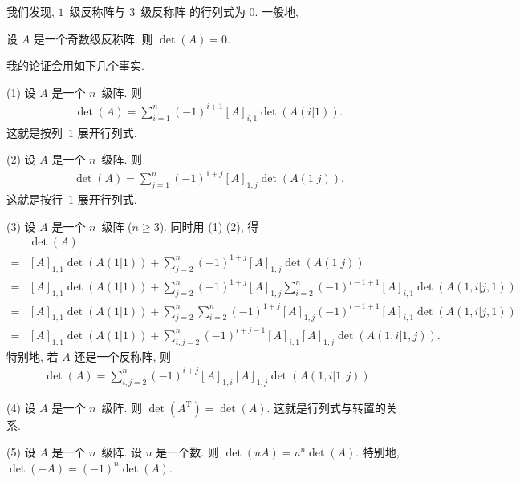 \documentclass[../libro.tex]{subfiles}
\begin{document}
我们发现, \(1\)~级反称阵与 \(3\)~级反称阵%
的行列式为 \(0\).
一般地,

\begin{theorem}
    设 \(A\) 是一个奇数级反称阵.
    则 \(\det {(A)} = 0\).
\end{theorem}

我的论证会用如下几个事实.

(1)
设 \(A\) 是一个 \(n\)~级阵.
则
\begin{align*}
    \det {(A)}
    = \sum_{i = 1}^{n}
    {(-1)^{i+1} [A]_{i,1} \det {(A(i|1))}}.
\end{align*}
这就是按列~\(1\) 展开行列式.

(2)
设 \(A\) 是一个 \(n\)~级阵.
则
\begin{align*}
    \det {(A)}
    = \sum_{j = 1}^{n}
    {(-1)^{1+j} [A]_{1,j} \det {(A(1|j))}}.
\end{align*}
这就是按行~\(1\) 展开行列式.

(3)
设 \(A\) 是一个 \(n\)~级阵 (\(n \geq 3\)).
同时用 (1) (2),
得
\begin{align*}
    & \det {(A)}
    \\
    = {} &
    [A]_{1,1} \det {(A(1|1))}
    +
    \sum_{j = 2}^{n} {
        (-1)^{1+j} [A]_{1,j} \det {(A(1|j))}
    }
    \\
    = {} &
    [A]_{1,1} \det {(A(1|1))}
    +
    \sum_{j = 2}^{n} {
        (-1)^{1+j} [A]_{1,j}
        \sum_{i = 2}^{n} {
            (-1)^{i-1+1} [A]_{i,1} \det {(A(1,i|j,1))}
        }
    }
    \\
    = {} &
    [A]_{1,1} \det {(A(1|1))}
    +
    \sum_{j = 2}^{n} {
        \sum_{i = 2}^{n} {
            (-1)^{1+j} [A]_{1,j}
            (-1)^{i-1+1} [A]_{i,1} \det {(A(1,i|j,1))}
        }
    }
    \\
    = {} &
    [A]_{1,1} \det {(A(1|1))}
    +
    \sum_{i, j = 2}^{n} {
        (-1)^{i+j-1}
        [A]_{i,1} [A]_{1,j} \det {(A(1,i|1,j))}
    }.
\end{align*}
特别地, 若 \(A\) 还是一个反称阵, 则
\begin{align*}
    \det {(A)}
    = \sum_{i, j = 2}^{n} {
        (-1)^{i+j}
        [A]_{1,i} [A]_{1,j} \det {(A(1,i|1,j))}
    }.
\end{align*}

(4)
设 \(A\) 是一个 \(n\)~级阵.
则 \(\det {(A^{\mathrm{T}})} = \det {(A)}\).
这就是行列式与转置的关系.

(5)
设 \(A\) 是一个 \(n\)~级阵.
设 \(u\) 是一个数.
则 \(\det {(uA)} = u^n \det {(A)}\).
特别地,
\(\det {(-A)} = (-1)^n \det {(A)}\).
\end{document}
